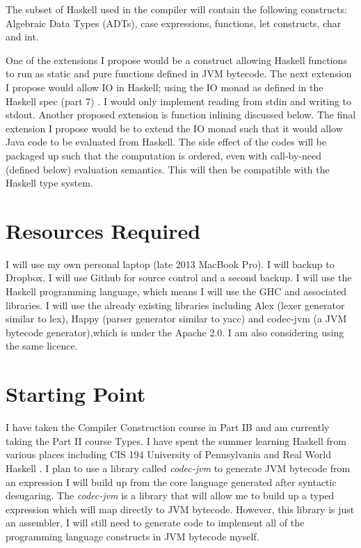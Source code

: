 \documentclass[12pt,a4paper,twoside]{article}
\begin{document}
  The subset of Haskell used in the compiler will contain the following constructs: Algebraic Data Types (ADTs), case expressions,
  functions, let constructs, char and int.

  One of the extensions I propose would be a construct allowing Haskell functions to run as static and pure functions defined in JVM bytecode.
  The next extension I propose would allow IO in Haskell; using the IO monad as defined in the Haskell spec (part 7) \cite{haskell98-spec}.
  I would only implement reading from stdin and writing to stdout. Another proposed extension is function inlining discussed below.
  The final extension I propose would be to extend the IO monad such that it would allow Java code to be evaluated from Haskell. The side effect of the codes
  will be packaged up such that the computation is ordered, even with call-by-need (defined below) evaluation semantics.
  This will then be compatible with the Haskell type system.

\section*{Resources Required}
  I will use my own personal laptop (late 2013 MacBook Pro).
  I will backup to Dropbox.
  I will use Github for source control and a second backup.
  I will use the Haskell programming language, which means I will use the GHC and associated libraries.
  I will use the already existing libraries including Alex (lexer generator similar to lex),
  Happy (parser generator similar to yacc) and codec-jvm (a JVM bytecode generator),which is under the Apache 2.0. I am also considering using the same licence.

\section*{Starting Point}
  I have taken the Compiler Construction course in Part IB and am currently taking the Part II course Types. I have spent the summer
  learning Haskell from various places including CIS 194 University of Pennsylvania \cite{cis194} and Real World Haskell \cite{realworldhaskell}.
  I plan to use a library called \textit{codec-jvm} to generate JVM bytecode from an expression I will build up from the core language generated after
  syntactic desugaring. The \textit{codec-jvm} is a library that will allow me to build up a typed expression which will map directly
  to JVM bytecode. However, this library is just an assembler, I will still need to generate code to implement all of the
  programming language constructs in JVM bytecode myself.
\end{document}
